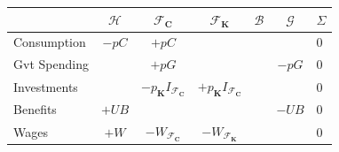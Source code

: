 \begin{table}
    \centering
    \begin{tabular}{l|ccccc|l}

                               & $\mathcal{H}$                   & $\mathcal{F}_\mathbf{C}$                                                                                    & $\mathcal{F}_\mathbf{K}$                                                                                    & $\mathcal{B}$                                             & $\mathcal{G}$       & $\Sigma$ \\
        \midrule
        Consumption            & $-p C$                          & $+p C$                                                                                                      &                                                                                                             &                                                           &                     & 0        \\
        Gvt Spending           &                                 & $+p G$                                                                                                      &                                                                                                             &                                                           & $-p G$              & 0        \\
        Investments            &                                 & $-p_\mathbf{K} I_{\mathcal{F}_\mathbf{C}}$                                                                  & $+p_\mathbf{K} I_{\mathcal{F}_\mathbf{C}}$                                                                  &                                                           &                     & 0        \\
        Benefits               & $+UB$                           &                                                                                                             &                                                                                                             &                                                           & $-UB$               & 0        \\
        Wages                  & $+W$                            & $-W_{\mathcal{F}_\mathbf{C}}$                                                                               & $-W_{\mathcal{F}_\mathbf{K}}$                                                                               &                                                           &                     & 0        \\

\end{tabular}
\end{table}
